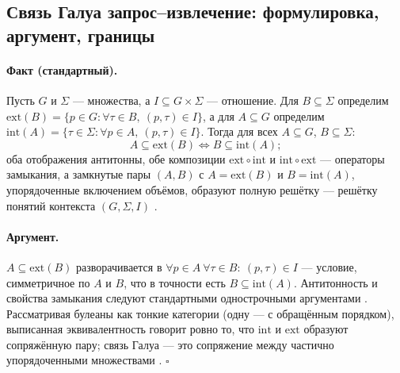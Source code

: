 \documentclass{article}
\begin{document}
\subsection{Связь Галуа запрос--извлечение: формулировка, аргумент, границы}
\label{p1:app:galois}

\paragraph{Факт (стандартный).}
Пусть $G$ и $\Sigma$ --- множества, а $I \subseteq G \times \Sigma$ --- отношение. Для $B \subseteq \Sigma$ определим $\mathrm{ext}(B) = \{p \in G : \forall \tau \in B,\ (p,\tau) \in I\}$, а для $A \subseteq G$ определим $\mathrm{int}(A) = \{\tau \in \Sigma : \forall p \in A,\ (p,\tau) \in I\}$. Тогда для всех $A \subseteq G$, $B \subseteq \Sigma$:
\[
A \subseteq \mathrm{ext}(B) \iff B \subseteq \mathrm{int}(A);
\]
оба отображения антитонны, обе композиции $\mathrm{ext}\circ\mathrm{int}$ и $\mathrm{int}\circ\mathrm{ext}$ --- операторы замыкания, а замкнутые пары $(A, B)$ с $A = \mathrm{ext}(B)$ и $B = \mathrm{int}(A)$, упорядоченные включением объёмов, образуют полную решётку --- решётку понятий контекста $(G, \Sigma, I)$ \citep{ganter1999fca}.

\paragraph{Аргумент.}
$A \subseteq \mathrm{ext}(B)$ разворачивается в $\forall p \in A\ \forall \tau \in B:\ (p,\tau) \in I$ --- условие, симметричное по $A$ и $B$, что в точности есть $B \subseteq \mathrm{int}(A)$. Антитонность и свойства замыкания следуют стандартными однострочными аргументами \citep[Ch.~1]{ganter1999fca}. Рассматривая булеаны как тонкие категории (одну --- с обращённым порядком), выписанная эквивалентность говорит ровно то, что $\mathrm{int}$ и $\mathrm{ext}$ образуют сопряжённую пару; связь Галуа --- это сопряжение между частично упорядоченными множествами \citep[Ch.~IV]{maclane1998categories}. \hfill$\square$
\end{document}
